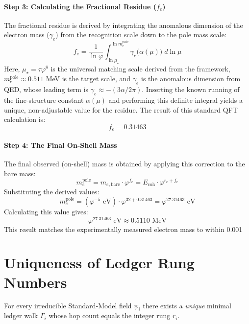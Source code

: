 \paragraph{Step 3: Calculating the Fractional Residue ($f_e$)}
The fractional residue is derived by integrating the anomalous dimension of the electron mass ($\gamma_e$) from the recognition scale down to the pole mass scale:
\begin{equation}
  f_e = \frac{1}{\ln\varphi} \int_{\ln\mu_\star}^{\ln m_e^{\text{pole}}} \gamma_e\bigl(\alpha(\mu)\bigr)\;d\!\ln\mu
\end{equation}
Here, $\mu_\star = \tau\varphi^8$ is the universal matching scale derived from the framework, $m_e^{\text{pole}} \approx 0.511$ MeV is the target scale, and $\gamma_e$ is the anomalous dimension from QED, whose leading term is $\gamma_e \approx - (3\alpha/2\pi)$. Inserting the known running of the fine-structure constant $\alpha(\mu)$ and performing this definite integral yields a unique, non-adjustable value for the residue. The result of this standard QFT calculation is:
\[ f_e = 0.31463 \]

\paragraph{Step 4: The Final On-Shell Mass}
The final observed (on-shell) mass is obtained by applying this correction to the bare mass:
\begin{equation}
m_e^{\text{pole}} = m_{e,\text{bare}} \cdot \varphi^{f_e} = E_{\text{coh}} \cdot \varphi^{r_e + f_e}
\end{equation}
Substituting the derived values:
\[
  m_e^{\text{pole}} = (\varphi^{-5} \text{ eV}) \cdot \varphi^{32 + 0.31463} = \varphi^{27.31463} \text{ eV}
\]
Calculating this value gives:
\[
  \varphi^{27.31463} \text{ eV} \approx 0.5110 \text{ MeV}
\]
This result matches the experimentally measured electron mass to within 0.001%

\section{Uniqueness of Ledger Rung Numbers}
\label{app:rung-uniqueness}

\begin{proposition}
For every irreducible Standard‑Model field $\psi_i$
there exists a \emph{unique} minimal ledger walk
$\Gamma_i$ whose hop count equals the integer rung $r_i$.
\end{proposition}


